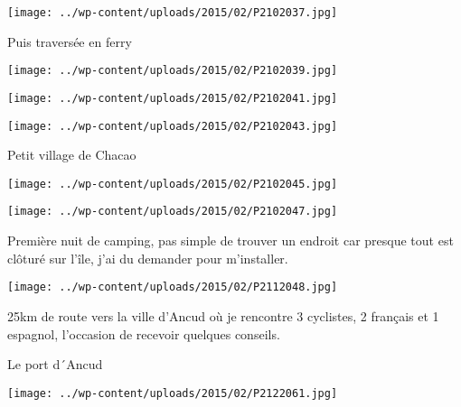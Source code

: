  

\begin{center} \texttt{[image: ../wp-content/uploads/2015/02/P2102037.jpg]} \end{center}

 

 Puis traversée en ferry

 

\begin{center} \texttt{[image: ../wp-content/uploads/2015/02/P2102039.jpg]} \end{center}



\begin{center} \texttt{[image: ../wp-content/uploads/2015/02/P2102041.jpg]} \end{center}



\begin{center} \texttt{[image: ../wp-content/uploads/2015/02/P2102043.jpg]} \end{center}

 

 Petit village de Chacao

 

\begin{center} \texttt{[image: ../wp-content/uploads/2015/02/P2102045.jpg]} \end{center}



\begin{center} \texttt{[image: ../wp-content/uploads/2015/02/P2102047.jpg]} \end{center}

 

 Première nuit de camping, pas simple de trouver un endroit car presque tout est clôturé sur l'île, j'ai du demander pour m'installer.

 

\begin{center} \texttt{[image: ../wp-content/uploads/2015/02/P2112048.jpg]} \end{center}

 25km de route vers la ville d'Ancud où je rencontre 3 cyclistes, 2 français et 1 espagnol, l'occasion de recevoir quelques conseils.

 Le port d´Ancud

 

\begin{center} \texttt{[image: ../wp-content/uploads/2015/02/P2122061.jpg]} \end{center}



